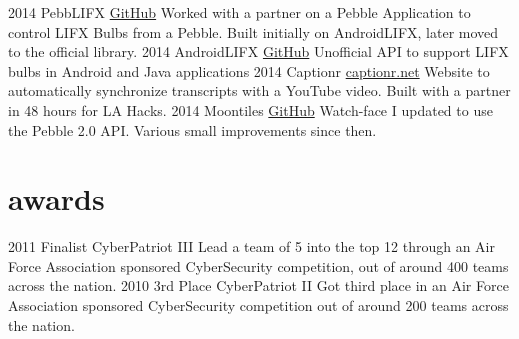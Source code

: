 \documentclass[]{akers-cv}
\begin{document}
\begin{entrylist}
  \entry
    {2014}
    {PebbLIFX}
    {\href{https://github.com/jadengore/PebbLIFX}{GitHub}}
    {Worked with a partner on a Pebble Application to control LIFX Bulbs from a Pebble. Built initially on AndroidLIFX, later moved to the official library.}
  \entry
    {2014}
    {AndroidLIFX}
    {\href{https://github.com/akrs/AndroidLIFX}{GitHub}}
    {Unofficial API to support LIFX bulbs in Android and Java applications}
  \entry
    {2014}
    {Captionr}
    {\href{http://captionr.net}{captionr.net}}
    {Website to automatically synchronize transcripts with a YouTube video. Built with a partner in 48 hours for LA Hacks.}
  \entry
    {2014}
    {Moontiles}
    {\href{https://github.com/akrs/moontiles}{GitHub}}
    {Watch-face I updated to use the Pebble 2.0 API. Various small improvements since then.}
\end{entrylist}

\section{awards}

\begin{entrylist}
  \entry
    {2011}
    {Finalist}
    {CyberPatriot III}
    {Lead a team of 5 into the top 12 through an Air Force Association sponsored CyberSecurity competition, out of around 400 teams across the nation.}
  \entry
    {2010}
    {3rd Place}
    {CyberPatriot II}
    {Got third place in an Air Force Association sponsored CyberSecurity competition out of around 200 teams across the nation.}
 \end{entrylist}
\end{document}
